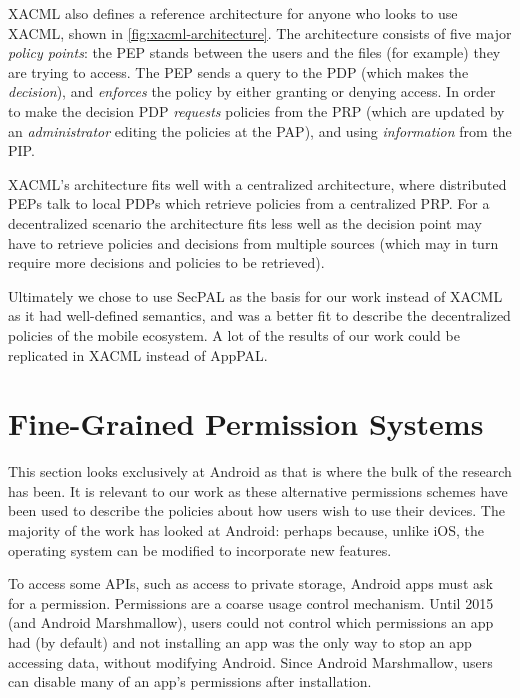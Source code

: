 \documentclass[thesis.tex]{subfiles}
\begin{document}
XACML also defines a reference architecture for anyone who looks to use XACML,
shown in \autoref{fig:xacml-architecture}. The architecture consists of five
major \emph{policy points}: the PEP stands between the users and the files (for
example) they are trying to access. The PEP sends a query to the PDP (which
makes the \emph{decision}), and \emph{enforces} the policy by either granting or
denying access. In order to make the decision PDP \emph{requests} policies from
the PRP (which are updated by an \emph{administrator} editing the policies at
the PAP), and using \emph{information} from the PIP. 

XACML's architecture fits well with a centralized architecture, where
distributed PEPs talk to local PDPs which retrieve policies from a centralized
PRP. For a decentralized scenario the architecture fits less well as the
decision point may have to retrieve policies and decisions from multiple sources
(which may in turn require more decisions and policies to be retrieved).

Ultimately we chose to use SecPAL as the basis for our work instead of XACML as
it had well-defined semantics, and was a better fit to describe the
decentralized policies of the mobile ecosystem. A lot of the results of our work
could be replicated in XACML instead of AppPAL. 

\section{Fine-Grained Permission Systems}
\label{sec:fine-grained-permissions}

This section looks exclusively at Android as that is where the bulk of
the research has been. It is relevant to our work as these alternative
permissions schemes have been used to describe the policies about how
users wish to use their devices. The majority of the work has looked
at Android: perhaps because, unlike iOS, the operating system can be
modified to incorporate new features.


To access some APIs, such as access to private storage, Android apps
must ask for a permission. Permissions are a coarse usage control
mechanism. Until 2015 (and Android Marshmallow), users could not
control which permissions an app had (by default) and not installing
an app was the only way to stop an app accessing data, without
modifying Android.  Since Android Marshmallow, users can disable many
of an app's permissions after installation.
\end{document}
